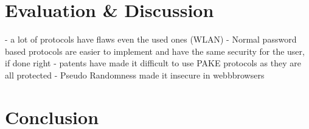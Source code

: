 \documentclass[journal]{IEEEtran}
\begin{document}
\section{Evaluation \& Discussion}
- a lot of protocols have flaws even the used ones (WLAN)
- Normal password based protocols are easier to implement and have the same security for the user, if done right
- patents have made it difficult to use PAKE protocols as they are all protected
- Pseudo Randomness made it insecure in webbbrowsers

\section{Conclusion}





\end{document}
